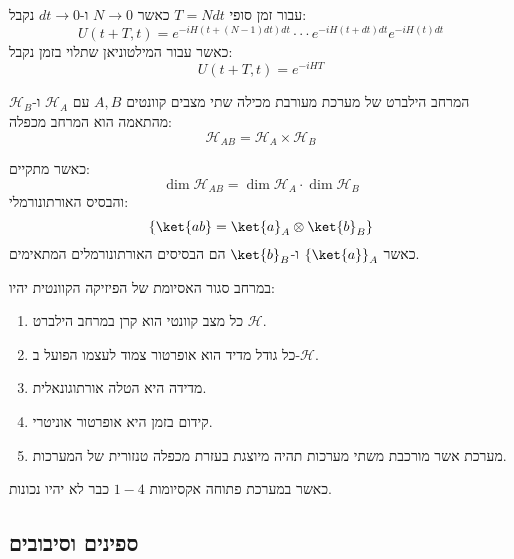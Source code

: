 \documentclass{tstextbook}
\begin{document}
עבור זמן סופי \(T=Ndt\) כאשר \(N\to 0\) ו-\(dt \to 0\) נקבל:
$$U\left(t+T,t\right)=e^{-i H\left(t+\left(N-1\right)d t\right)d t}\cdot\cdot\cdot e^{-i H\left(t+d t\right)d t}e^{-i H\left(t\right)d t}$$
כאשר עבור המילטוניאן שתלוי בזמן נקבל:
$$U(t+T,t)=e^{ -iHT }$$

\begin{definition}
המרחב הילברט של מערכת מעורבת מכילה שתי מצבים קוונטים \(A,B\) עם \(\mathcal{H}_{A}\) ו-\(\mathcal{H}_{B}\) מהתאמה הוא המרחב מכפלה:
$$\mathcal{H}_{AB}=\mathcal{H}_{A}\times \mathcal{H}_{B}$$

\end{definition}
כאשר מתקיים:
$$\dim \mathcal{H}_{AB}=\dim \mathcal{H}_{A} \cdot \dim \mathcal{H}_{B}$$
והבסיס האורתונורמלי:
$$\left\{  \ket{ab} =\ket{a} _{A}\otimes \ket{b} _{B}  \right\}$$
כאשר \(\left\{  \ket{a}  \right\}_{A}\) ו-\(\ket{b}_{B}\) הם הבסיסים האורתונורמלים המתאימים.

\begin{summary}
במרחב סגור האסיומת של הפיזיקה הקוונטית יהיו:

  \begin{enumerate}
    \item כל מצב קוונטי הוא קרן במרחב הילברט \(\mathcal{H}\). 


    \item כל גודל מדיד הוא אופרטור צמוד לעצמו הפועל ב-\(\mathcal{H}\). 


    \item מדידה היא הטלה אורתוגונאלית. 


    \item קידום בזמן היא אופרטור אוניטרי. 


    \item מערכת אשר מורכבת משתי מערכות תהיה מיוצגת בעזרת מכפלה טנזורית של המערכות. 


  \end{enumerate}
\end{summary}
כאשר במערכת פתוחה אקסיומות \(1-4\) כבר לא יהיו נכונות.

\subsection{ספינים וסיבובים}
\end{document}
